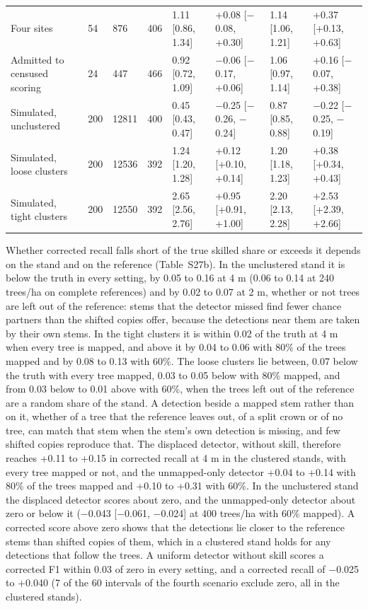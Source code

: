 \documentclass[10pt]{article}
\begin{document}
{\begin{xltabular}{\textwidth}{LlllLLLL}
Four sites & 54 & 876 & 406 & 1.11 [0.86, 1.34] & +0.08 [$-$0.08, +0.30] & 1.14 [1.06, 1.21] & +0.37 [+0.13, +0.63] \\
Admitted to censused scoring & 24 & 447 & 466 & 0.92 [0.72, 1.09] & $-$0.06 [$-$0.17, +0.06] & 1.06 [0.97, 1.14] & +0.16 [$-$0.07, +0.38] \\
Simulated, unclustered & 200 & 12811 & 400 & 0.45 [0.43, 0.47] & $-$0.25 [$-$0.26, $-$0.24] & 0.87 [0.85, 0.88] & $-$0.22 [$-$0.25, $-$0.19] \\
Simulated, loose clusters & 200 & 12536 & 392 & 1.24 [1.20, 1.28] & +0.12 [+0.10, +0.14] & 1.20 [1.18, 1.23] & +0.38 [+0.34, +0.43] \\
Simulated, tight clusters & 200 & 12550 & 392 & 2.65 [2.56, 2.76] & +0.95 [+0.91, +1.00] & 2.20 [2.13, 2.28] & +2.53 [+2.39, +2.66] \\
\end{xltabular}
}

Whether corrected recall falls short of the true skilled share or exceeds it
depends on the stand and on the reference (Table~S27b). In the unclustered stand
it is below the truth in every setting, by 0.05 to 0.16 at 4 m (0.06 to 0.14 at
240 trees/ha on complete references) and by 0.02 to 0.07 at 2 m, whether or not
trees are left out of the reference: stems that the detector missed find fewer
chance partners than the shifted copies offer, because the detections near them
are taken by their own stems. In the tight clusters it is within 0.02 of the
truth at 4 m when every tree is mapped, and above it by 0.04 to 0.06 with 80\% of
the trees mapped and by 0.08 to 0.13 with 60\%. The loose clusters lie between,
0.07 below the truth with every tree mapped, 0.03 to 0.05 below with 80\% mapped,
and from 0.03 below to 0.01 above with 60\%, when the trees left out of the
reference are a random share of the stand. A detection beside a mapped stem
rather than on it, whether of a tree that the reference leaves out, of a split
crown or of no tree, can match that stem when the stem's own detection is
missing, and few shifted copies reproduce that. The displaced detector, without
skill, therefore reaches +0.11 to +0.15 in corrected recall at 4 m in the
clustered stands, with every tree mapped or not, and the unmapped-only detector
+0.04 to +0.14 with 80\% of the trees mapped and +0.10 to +0.31 with 60\%. In the
unclustered stand the displaced detector scores about zero, and the
unmapped-only detector about zero or below it ($-$0.043 [$-$0.061, $-$0.024] at 400
trees/ha with 60\% mapped). A corrected score above zero shows that the
detections lie closer to the reference stems than shifted copies of them, which
in a clustered stand holds for any detections that follow the trees. A uniform
detector without skill scores a corrected F1 within 0.03 of zero in every
setting, and a corrected recall of $-$0.025 to +0.040 (7 of the 60 intervals of
the fourth scenario exclude zero, all in the clustered stands).
\end{document}
